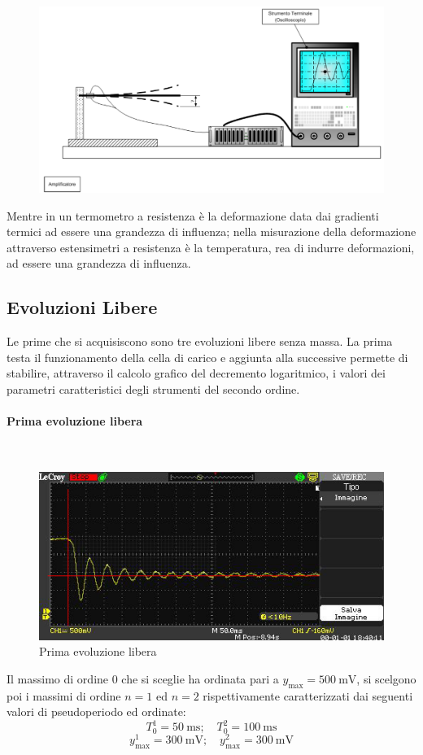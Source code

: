 \documentclass[a4paper, 12pt, twoside]{report}
\begin{document}
		\begin{figure}[H]
			\centering
			\includegraphics[width=0.7\linewidth]{immagini/catena2}
			\label{fig:catena2}
		\end{figure}
		
		 Mentre in un termometro a resistenza è la deformazione data dai gradienti termici ad essere una grandezza di influenza; nella misurazione della deformazione attraverso estensimetri a resistenza è la temperatura, rea di indurre deformazioni, ad essere una grandezza di influenza.
\newpage		 
		 \subsection{Evoluzioni Libere}
		 Le prime che si acquisiscono sono tre evoluzioni libere senza massa. La prima testa il funzionamento della cella di carico e aggiunta alla successive permette di stabilire, attraverso il calcolo grafico del decremento logaritmico, i valori dei parametri caratteristici degli strumenti del secondo ordine. 
		 
		 \paragraph{Prima evoluzione libera} \mbox{} \\
		 \begin{figure}[H]
		 	\centering
		 	\includegraphics[width=0.6\linewidth]{immaginioscillo/6+}
		 	\caption{Prima evoluzione libera}
		 	\label{fig:11}
		 \end{figure}
	 
	 	Il massimo di ordine $ 0 $ che si sceglie ha ordinata pari a $y_{\max}=\SI{500}{\milli\volt}$, si scelgono poi i massimi di ordine $n=1$ ed $n=2$ rispettivamente caratterizzati dai seguenti valori di pseudoperiodo ed ordinate:
	 	\[T^1_0=\SI{50}{\milli\second};\quad  T_0^2=\SI{100}{\milli\second}\]
	 	\[y^1_{\max}=\SI{300}{\milli\volt};\quad  y_{\max}^2=\SI{300}{\milli\volt}\]
	 	
\end{document}
